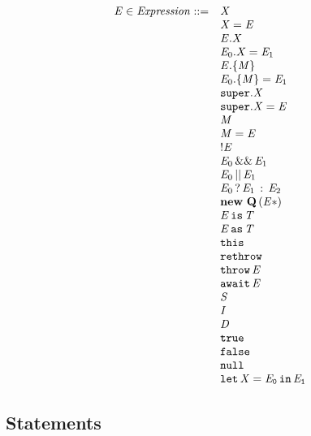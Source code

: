 \documentclass[a4paper,oneside]{article}
\newcommand{\synt}[1]{\ensuremath{\text{\textbf{#1}}}}
\begin{document}
\[
\begin{array}{rl}
  \expressionmeta \in \mathit{Expression} ::=
  & \VariableGet{\variablemeta} \\
  & \VariableSet{\variablemeta}{\expressionmeta} \\
  & \PropertyGet{\expressionmeta}{\idmeta} \\
  & \PropertySet{\expressionmeta_0}{\idmeta}{\expressionmeta_1} \\
  & \DirectPropertyGet{\expressionmeta}{\membermeta} \\
  & \DirectPropertySet{\expressionmeta_0}{\membermeta}{\expressionmeta_1} \\
  & \SuperPropertyGet{\idmeta} \\
  & \SuperPropertySet{\idmeta}{\expressionmeta} \\
  & \StaticGet{\membermeta} \\
  & \StaticSet{\membermeta}{\expressionmeta} \\
  & \Not{\expressionmeta} \\
  & \AndExpression{\expressionmeta_0}{\expressionmeta_1} \\
  & \OrExpression{\expressionmeta_0}{\expressionmeta_1} \\
  & \ConditionalExpression{\expressionmeta_0}{\expressionmeta_1}{\expressionmeta_2} \\
  & \New{\synt{Q}}{\expressionmeta*} \\
  & \IsExpression{\expressionmeta}{\typemeta} \\
  & \AsExpression{\expressionmeta}{\typemeta} \\
  & \ThisExpression \\
  & \Rethrow \\
  & \Throw{\expressionmeta} \\
  & \AwaitExpression{\expressionmeta} \\
  & \StringLiteral{\stringmeta} \\
  & \IntLiteral{\integermeta} \\
  & \DoubleLiteral{\doublemeta} \\
  & \BoolLiteral{\tt{true}} \\
  & \BoolLiteral{\tt{false}} \\
  & \NullLiteral \\
  & \Let{\variablemeta}{\expressionmeta_0}{\expressionmeta_1} \\
\end{array}
\]


\subsection{Statements}
\label{subsec:stmt-syntax}
\end{document}
